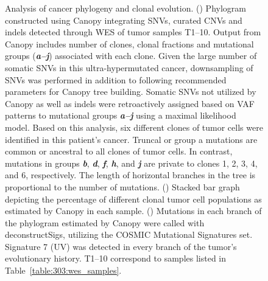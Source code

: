 \begin{figure}[htbp]
\begin{subfigure}{0.5\textwidth}
	    \caption{}\label{fig:303:sigs_per_branch}
	\end{subfigure}
	\caption[Analysis of cancer phylogeny and clonal evolution.]{Analysis of cancer phylogeny and clonal evolution. () Phylogram constructed using Canopy integrating SNVs, curated CNVs and indels detected through WES of tumor samples T1--10. Output from Canopy includes number of clones, clonal fractions and mutational groups (\textbf{\textit{a--j}}) associated with each clone. Given the large number of somatic SNVs in this ultra-hypermutated cancer, downsampling of SNVs was performed in addition to following recommended parameters for Canopy tree building. Somatic SNVs not utilized by Canopy as well as indels were retroactively assigned based on VAF patterns to mutational groups \textbf{\textit{a--j}} using a maximal likelihood model. Based on this analysis, six different clones of tumor cells were identified in this patient's cancer. Truncal or group a mutations are common or ancestral to all clones of tumor cells. In contrast, mutations in groups \textbf{\textit{b}}, \textbf{\textit{d}}, \textbf{\textit{f}}, \textbf{\textit{h}}, and \textbf{\textit{j}} are private to clones 1, 2, 3, 4, and 6, respectively. The length of horizontal branches in the tree is proportional to the number of mutations. () Stacked bar graph depicting the percentage of different clonal tumor cell populations as estimated by Canopy in each sample. () Mutations in each branch of the phylogram estimated by Canopy were called with deconstructSigs, utilizing the COSMIC Mutational Signatures set. Signature 7 (UV) was detected in every branch of the tumor's evolutionary history. T1--10 correspond to samples listed in Table~\ref{table:303:wes_samples}.}
	\label{fig:303:canopy_results}
\end{figure}
